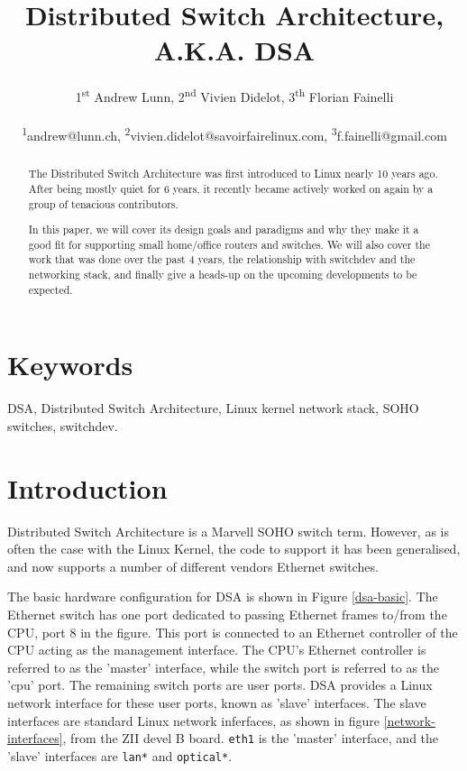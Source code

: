 \documentclass[letterpaper]{article}
\title{Distributed Switch Architecture,\\ A.K.A. DSA}
\author{1\textsuperscript{st} Andrew Lunn, 2\textsuperscript{nd} Vivien Didelot,  3\textsuperscript{th} Florian Fainelli\\
  \\
  \textsuperscript{1}andrew@lunn.ch,
  \textsuperscript{2}vivien.didelot@savoirfairelinux.com,
  \textsuperscript{3}f.fainelli@gmail.com\\
}
\begin{document}
\maketitle
\begin{abstract}

  The Distributed Switch Architecture was first introduced to Linux
  nearly 10 years ago. After being mostly quiet for 6 years, it
  recently became actively worked on again by a group of tenacious
  contributors.

  In this paper, we will cover its design goals and paradigms and why
  they make it a good fit for supporting small home/office routers and
  switches. We will also cover the work that was done over the past 4
  years, the relationship with switchdev and the networking stack, and
  finally give a heads-up on the upcoming developments to be expected.
\end{abstract}

\section{Keywords}

DSA, Distributed Switch Architecture, Linux kernel network stack, SOHO
switches, switchdev.

\section{Introduction}

Distributed Switch Architecture is a Marvell SOHO switch
term. However, as is often the case with the Linux Kernel, the code to
support it has been generalised, and now supports a number of
different vendors Ethernet switches.

The basic hardware configuration for DSA is shown in Figure
\ref{dsa-basic}. The Ethernet switch has one port dedicated to passing
Ethernet frames to/from the CPU, port 8 in the figure. This port is
connected to an Ethernet controller of the CPU acting as the
management interface. The CPU's Ethernet controller is referred to as
the 'master' interface, while the switch port is referred to as the
'cpu' port. The remaining switch ports are user ports. DSA provides a
Linux network interface for these user ports, known as 'slave'
interfaces. The slave interfaces are standard Linux network
inferfaces, as shown in figure \ref{network-interfaces}, from the ZII
devel B board.  \verb|eth1| is the 'master' interface, and the 'slave'
interfaces are \verb|lan*| and \verb|optical*|.
\end{document}
